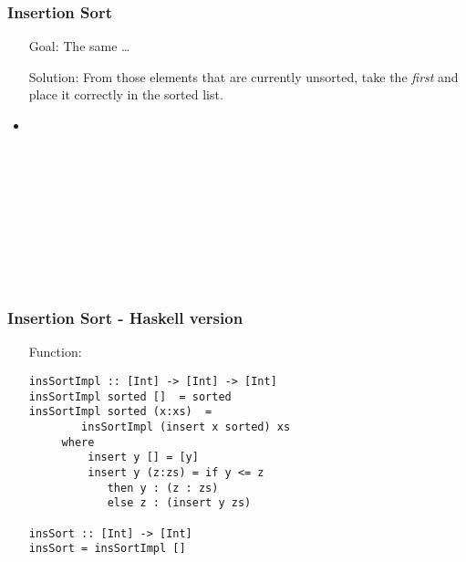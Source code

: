 \documentclass[final,handout]{beamer}
\begin{document}
\begin{frame}[fragile]
    \frametitle{Insertion Sort}

    \begin{itemize}
        \item[Goal:] The same \dots

        \item[Solution:] From those elements that are currently unsorted, take 
            the \emph{first} and place it correctly in the sorted list.

        \item<2->[Example:] ~\\ {\tt
            ~\\
            ~~~~~~~~~~~~\\
            ~\\
            ~~~~~~~~~~~\\
            ~\\
            ~~~~~~~~\\
            ~~~~\\
            ~~~~~\\
            ~~~~\\
            ~~\\
        }
    \end{itemize}
\end{frame}

\begin{frame}[fragile]
    \frametitle{Insertion Sort - Haskell version}

    \begin{itemize}
        \item[Function:]
            \begin{verbatim}
insSortImpl :: [Int] -> [Int] -> [Int]
insSortImpl sorted []  = sorted
insSortImpl sorted (x:xs)  = 
        insSortImpl (insert x sorted) xs
     where
         insert y [] = [y]
         insert y (z:zs) = if y <= z
            then y : (z : zs)
            else z : (insert y zs)

insSort :: [Int] -> [Int]
insSort = insSortImpl []
    \end{verbatim}
    \end{itemize}
\end{frame}
\end{document}
